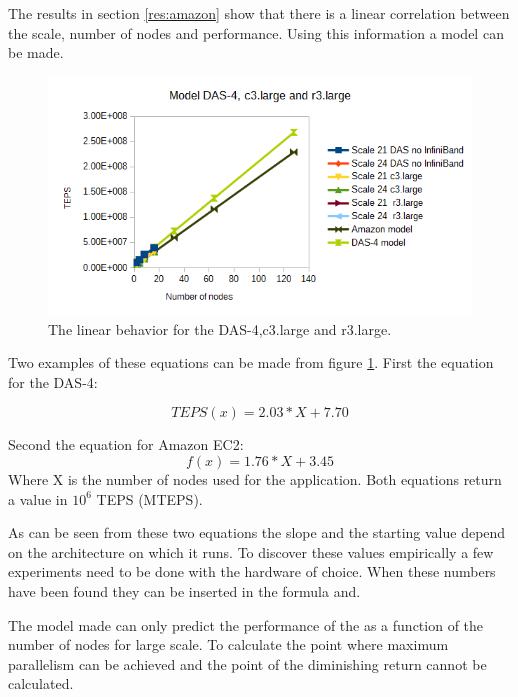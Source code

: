 The results in section \ref{res:amazon} show that there is a linear correlation between the scale, number of nodes and performance. Using this information a model can be made.

\begin{figure}[!h]
	\includegraphics[width=\textwidth]{images/model_figure_1.png}
	\caption{The linear behavior for the DAS-4,c3.large and r3.large.}
	\label{fig:model_first}
\end{figure}

Two examples of these equations can be made from figure \ref{fig:model_first}.
First the equation for the DAS-4:

\begin{equation}
TEPS(x) = 2.03 * X + 7.70
\end{equation}

Second the equation for Amazon EC2:
\begin{equation}
f(x) = 1.76 * X + 3.45
\end{equation}
Where X is the number of nodes used for the application. Both equations return a value in $10^6$ TEPS (MTEPS).

As can be seen from these two equations the slope and the starting value depend on the architecture on which it runs. To discover these values empirically a few experiments need to be done with the hardware of choice. When these numbers have been found they can be inserted in the formula and.

The model made can only predict the performance of the as a function of the number of nodes for large scale. To calculate the point where maximum parallelism can be achieved and the point of the diminishing return cannot be calculated.